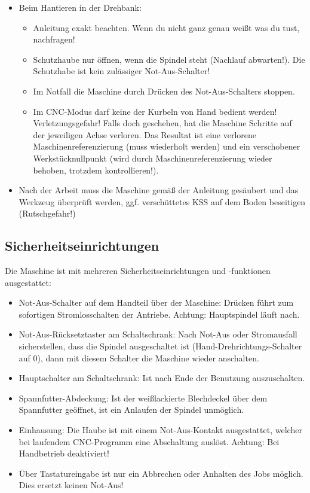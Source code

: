 \documentclass{\basedir/fablab-document}
\begin{document}
\begin{itemize}
 \item Beim Hantieren in der Drehbank:
\begin{itemize}
 \item Anleitung exakt beachten. Wenn du nicht ganz genau weißt was du tust, nachfragen!
 \item Schutzhaube nur öffnen, wenn die Spindel steht (Nachlauf abwarten!). Die Schutzhabe ist kein zulässiger Not-Aus-Schalter!
\item Im Notfall die Maschine durch Drücken des Not-Aus-Schalters stoppen.
\item Im CNC-Modus darf keine der Kurbeln von Hand bedient werden! Verletzungsgefahr! Falls doch geschehen, hat die Maschine Schritte auf der jeweiligen Achse verloren. Das Resultat ist eine verlorene Maschinenreferenzierung (muss wiederholt werden) und ein verschobener Werkstücknullpunkt (wird durch Maschinenreferenzierung wieder behoben, trotzdem kontrollieren!).
\end{itemize}
\item Nach der Arbeit muss die Maschine gemäß der Anleitung gesäubert und das Werkzeug überprüft werden, ggf. verschüttetes KSS auf dem Boden beseitigen (Rutschgefahr!)

\end{itemize}
\subsection{Sicherheitseinrichtungen}
Die Maschine ist mit mehreren Sicherheitseinrichtungen und -funktionen ausgestattet:
\begin{itemize}
	\item Not-Aus-Schalter auf dem Handteil über der Maschine: Drücken führt zum sofortigen Stromlosschalten der Antriebe. Achtung: Hauptspindel läuft nach.
	\item Not-Aus-Rücksetztaster am Schaltschrank: Nach Not-Aus oder Stromausfall sicherstellen, dass die Spindel ausgeschaltet ist (Hand-Drehrichtungs-Schalter auf 0), dann mit diesem Schalter die Maschine wieder anschalten.
	\item Hauptschalter am Schaltschrank: Ist nach Ende der Benutzung auszuschalten.
	\item Spannfutter-Abdeckung: Ist der weißlackierte Blechdeckel über dem Spannfutter geöffnet, ist ein Anlaufen der Spindel unmöglich.
	\item Einhausung: Die Haube ist mit einem Not-Aus-Kontakt ausgestattet, welcher bei laufendem CNC-Programm eine Abschaltung auslöst. Achtung: Bei Handbetrieb deaktiviert!
	\item Über Tastatureingabe ist nur ein Abbrechen oder Anhalten des Jobs möglich. Dies ersetzt keinen Not-Aus!
\end{itemize}
\end{document}
